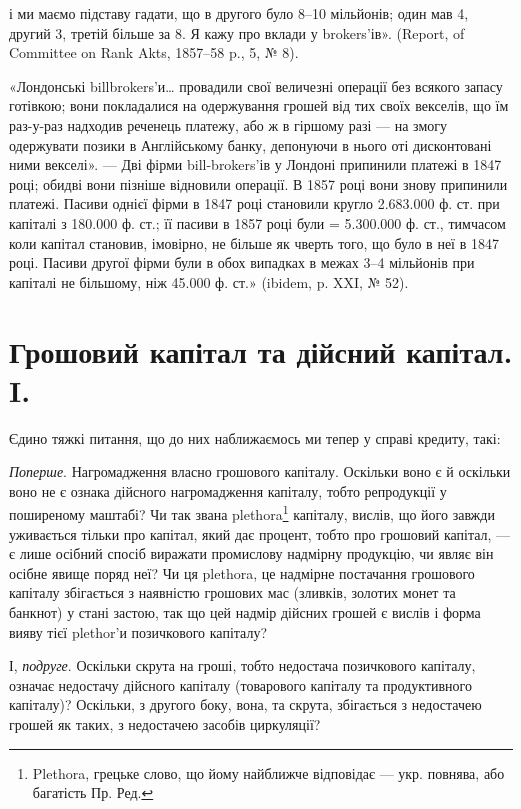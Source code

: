 \parcont{}  %
і ми маємо підставу гадати, що в другого було 8--10 мільйонів; один мав 4,
другий 3, третій більше за 8. Я кажу про вклади у brokers’ів». (Report,
of Committee on Rank Akts, 1857--58 p., 5, № 8).

«Лондонські billbrokers’и\dots{} провадили свої величезні операції без всякого
запасу готівкою; вони покладалися на одержування грошей від тих своїх векселів,
що їм раз-у-раз надходив реченець платежу, або ж в гіршому разі — на змогу
одержувати позики в Англійському банку, депонуючи в нього оті дисконтовані
ними векселі». — Дві фірми bill-brokers’ів у Лондоні припинили платежі в
1847 році; обидві вони пізніше відновили операції. В 1857 році вони знову
припинили платежі. Пасиви однієї фірми в 1847 році становили кругло
\num{2.683.000} ф. ст. при капіталі з \num{180.000} ф. ст.; її пасиви в 1857 році були =
\num{5.300.000} ф. ст., тимчасом коли капітал становив, імовірно, не більше як чверть
того, що було в неї в 1847 році. Пасиви другої фірми були в обох випадках
в межах 3--4 мільйонів при капіталі не більшому, ніж \num{45.000} ф. ст.» (ibidem,
p. XXI, № 52).

\section{Грошовий капітал та дійсний капітал. I.}

Єдино тяжкі питання, що до них наближаємось ми тепер у справі кредиту,
такі:

\emph{Поперше}. Нагромадження власно грошового капіталу. Оскільки воно
є й оскільки воно не є ознака дійсного нагромадження капіталу, тобто репродукції
у поширеному маштабі? Чи так звана plethora\footnote*{
Plethora, грецьке слово, що йому найближче відповідає — укр. повнява, або багатість Пр. Ред.
} капіталу, вислів, що його
завжди уживається тільки про капітал, який дає процент, тобто про грошовий
капітал, — є лише осібний спосіб виражати промислову надмірну продукцію,
чи являє він осібне явище поряд неї? Чи ця plethora, це надмірне постачання
грошового капіталу збігається з наявністю грошових мас (зливків,
золотих монет та банкнот) у стані застою, так що цей надмір дійсних грошей
є вислів і форма вияву тієї plethor’и позичкового капіталу?

І, \emph{подруге}. Оскільки скрута на гроші, тобто недостача позичкового капіталу,
означає недостачу дійсного капіталу (товарового капіталу та продуктивного
капіталу)? Оскільки, з другого боку, вона, та скрута, збігається з недостачею
грошей як таких, з недостачею засобів циркуляції?

